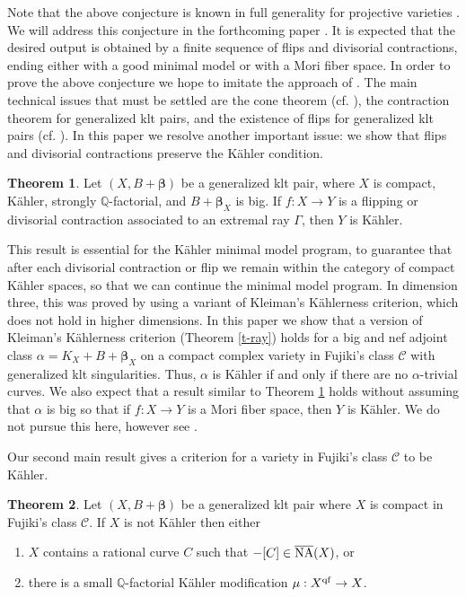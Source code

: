 \documentclass[11pt]{amsart}
\numberwithin{equation}{section}
\def\bbeta{\boldsymbol{\beta}}
\newcommand\Q{{\mathbb{Q}}}
\theoremstyle{definition}
\theoremstyle{definition}
\newtheorem{theorem}{Theorem}[section]
\theoremstyle{definition}
\begin{document}
Note that the above conjecture is known in full generality for projective varieties \cite{DH24}.  We will address this conjecture in the forthcoming paper \cite{HX26}.
It is expected that the desired output is obtained by a finite sequence of flips and divisorial contractions, ending either with a good minimal model or with a Mori fiber space. 
In order to prove the above conjecture we hope to imitate the approach of \cite{BCHM10}. The main technical issues that must be settled are the cone theorem  (cf. \cite{HP24}),
the contraction theorem for generalized klt pairs, and the existence of flips for generalized klt pairs (cf. \cite{DH23,DH25}).
In this paper we resolve 
another important issue: we show that flips and divisorial contractions preserve the K\"ahler condition.


\begin{theorem}\label{t-contK}
Let $(X,B+\bbeta)$ be a generalized klt pair, where $X$ is compact, K\"ahler,  strongly
$\Q$-factorial, and $B+\bbeta_X$ is big. If
$f: X\to Y$ is a flipping or divisorial contraction associated to an extremal ray $\Gamma$, then $Y$ is K\"ahler.
\end{theorem}

This result is essential for the K\"ahler minimal model program, to guarantee that after each divisorial contraction or flip we remain within the category of compact K\"ahler spaces, so that we can continue the minimal model program. In dimension three, this was proved by \cite{HP16,CHP16,DHY23} using a variant of Kleiman's K\"ahlerness criterion, which does not hold in higher dimensions. In this paper we show that a version of Kleiman's K\"ahlerness criterion (Theorem \ref{t-ray}) holds 
 for a big and nef adjoint class $\alpha = K_X + B + \bbeta_X$ on a compact complex variety in Fujiki's class $\mathcal{C}$ with generalized klt singularities. Thus, $\alpha$ is K\"ahler if and only if there are no $\alpha$-trivial curves. We also expect that a result similar to Theorem \ref{t-contK} holds without
assuming that $\alpha$ is big so that if $f:X\to Y$ is a Mori fiber space, then $Y$ is K\"ahler. We do not pursue this here, however see \cite[Theorem 7.1]{HX26}.  


Our second main result gives a criterion for a variety in Fujiki's class $\mathcal C$ to be K\"ahler.

\begin{theorem}\label{c-1} Let $(X,B+\bbeta)$ be a generalized klt pair where $X$ is compact in Fujiki's class $\mathcal C$. If $X$ is not K\"ahler then either
\begin{enumerate}
\item $X$ contains a rational curve $C$ such that $-[C]\in \overline{\rm NA}(X)$, or
\item there is a small $\Q$-factorial K\"ahler modification $\mu:X^{\rm qf}\to X$. 
\end{enumerate}
\end{theorem}
\end{document}
